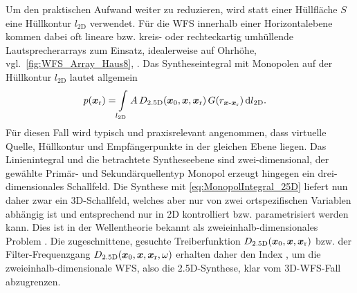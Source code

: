 Um den praktischen Aufwand weiter zu reduzieren, wird statt
einer Hüllfläche $S$ eine Hüllkontur $l_\text{2D}$ verwendet.
%
Für die WFS innerhalb einer Horizontalebene kommen dabei oft lineare bzw.
kreis- oder rechteckartig umhüllende Lautsprecherarrays zum Einsatz,
idealerweise auf Ohrhöhe,
vgl.~\Abb\ref{fig:WFS_Array_Haus8}, \cite{Vries2009_Mono,Vries2019}.
%
Das Syntheseintegral mit Monopolen auf der Hüllkontur $l_\text{2D}$
lautet allgemein
\begin{align}
p(\bm{x}_\mathrm{r}) =& \int\limits_{l_\text{2D}} A \, D_\text{2.5D}(\bm{x}_\mathrm{0},\bm{x},\bm{x}_\mathrm{r}) \, G(r_{\bm{x}\text{-}\bm{x}_\mathrm{r}}) \, \mathrm{d}l_\text{2D}.
\label{eq:MonopolIntegral_25D}
\end{align}
%
Für diesen Fall wird typisch und praxisrelevant angenommen, dass
virtuelle Quelle, Hüllkontur und Empfängerpunkte in der gleichen Ebene liegen.
%
Das Linienintegral und die betrachtete Syntheseebene sind zwei-dimensional,
der gewählte Primär- und Sekundärquellentyp Monopol erzeugt hingegen ein
drei-dimensionales Schallfeld.
%
Die Synthese mit \Glg\eqref{eq:MonopolIntegral_25D} liefert nun daher
zwar ein 3D-Schallfeld, welches aber nur von zwei ortspezifischen
Variablen abhängig ist und
entsprechend nur in 2D kontrolliert bzw. parametrisiert werden kann.
%
Dies ist in der Wellentheorie bekannt als zweieinhalb-dimensionales
Problem \cite{Bleistein1986}. %
%
Die zugeschnittene, gesuchte Treiberfunktion $D_\text{2.5D}(\bm{x}_\mathrm{0},\bm{x},\bm{x}_\mathrm{r})$ bzw.
der Filter-Frequenzgang $D_\text{2.5D}(\bm{x}_\mathrm{0},\bm{x},\bm{x}_\mathrm{r},\omega)$ erhalten daher
den Index , um die zweieinhalb-dimensionale WFS, also
die 2.5D-Synthese, klar vom 3D-WFS-Fall abzugrenzen.


